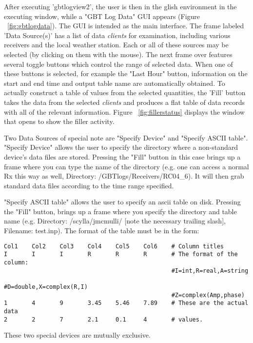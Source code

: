 After executing 'gbtlogview2', the user is then in the glish environment in 
the executing window, while
a "GBT Log Data" GUI appears (Figure ~\ref{fig:gbtlogdata}). The GUI is
intended as the main interface. The frame labeled 'Data Source(s)' has
a list of data {\it clients} for examination, including various receivers
and the local weather station. Each or all of these sources may be
selected (by clicking on them with the mouse). The next frame over features
several toggle buttons which control the range of selected data. When
one of these buttons is selected, for example the "Last Hour" button,
information on the start and end time and output table name are automatically
obtained. To actually construct a table of values from the selected 
quantities, the 'Fill' button takes the data from the selected {\it clients}
and produces a flat table of data records with all of the relevant 
information. Figure ~\ref{fig:fillerstatus} displays the window that opens
to show the filler activity.

Two Data Sources of special note are "Specify Device" and "Specify ASCII 
table". "Specify Device" allows the user to specify the directory where
a non-standard device's data files are stored. Pressing the "Fill" button
in this case brings up a frame where you can type the name of the 
directory (e.g. one can access a normal Rx this way as well, 
Directory: /GBTlogs/Receivers/RC04\_6). It will then grab standard data
files according to the time range specified.

"Specify ASCII table" allows the user to specify an ascii table on
disk. Pressing the "Fill" button, brings up a frame where you specify
the directory and table name (e.g. Directory: /scylla/jmcmulli/ [note
the necessary trailing slash], Filename: test.inp). The format of the table
must be in the form:

\begin{verbatim}
Col1	Col2	Col3	Col4	Col5	Col6	# Column titles
I       I       I       R       R       R       # The format of the column:
                                                #I=int,R=real,A=string
                                                #D=double,X=complex(R,I)
                                                #Z=complex(Amp,phase)
1       4       9       3.45    5.46    7.89    # These are the actual data
2       2       7       2.1     0.1     4       # values.
\end{verbatim}

These two special devices are mutually exclusive.

